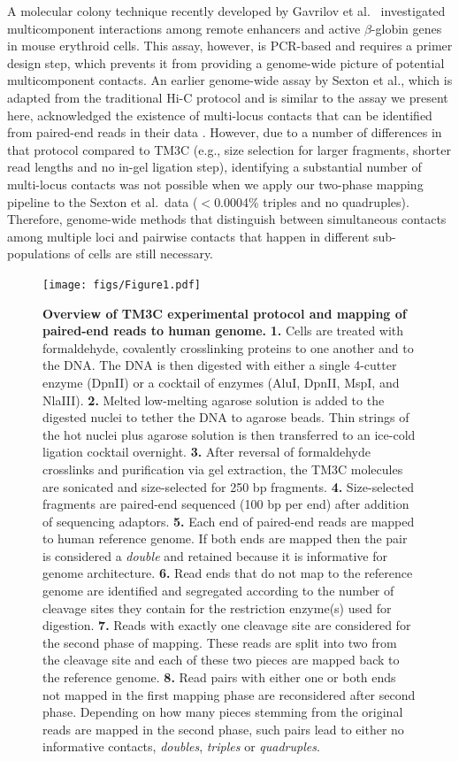 {
A molecular colony technique recently developed by Gavrilov et
al.\ \cite{gavrilov:quantitative} investigated multicomponent interactions
among remote enhancers and active $\beta$-globin genes in
mouse erythroid cells. This assay, however, is PCR-based and requires a
primer design step, which prevents it from providing a genome-wide
picture of potential multicomponent contacts. An earlier genome-wide
assay by Sexton et al., which is adapted from the traditional Hi-C protocol and
is similar to the assay we present here, acknowledged the existence
of multi-locus contacts that can be identified from paired-end reads
in their data \cite{sexton:three-dimensional}.
However, due to a number of differences in that
protocol compared to TM3C (e.g., size selection for larger fragments,
shorter read lengths and no in-gel ligation step), identifying a
substantial number of multi-locus contacts was not possible when we
apply our two-phase mapping pipeline to the Sexton et al.\ data
($<$0.0004\% triples and no quadruples). Therefore, genome-wide methods
that distinguish between simultaneous contacts among multiple loci and
pairwise contacts that happen in different sub-populations of cells
are still necessary.
}
\begin{figure}
\centering
\texttt{[image: figs/Figure1.pdf]}
\caption{
\textbf{Overview of TM3C experimental protocol and mapping of paired-end reads to human genome.}
  {\bf 1.} Cells are treated with
  formaldehyde, covalently crosslinking proteins to one another and to
  the DNA. The DNA is then digested with either a single 4-cutter
  enzyme (DpnII) or a cocktail of enzymes (AluI, DpnII, MspI, and
  NlaIII). {\bf 2.} Melted low-melting agarose solution is added to
  the digested nuclei to tether the DNA to agarose beads.  Thin
  strings of the hot nuclei plus agarose solution is then transferred to an
  ice-cold ligation cocktail overnight. {\bf 3.} After reversal of
  formaldehyde crosslinks and purification via gel extraction, the
  TM3C molecules are sonicated and size-selected for 250 bp fragments.
  {\bf 4.} Size-selected fragments are paired-end sequenced (100 bp per end)
  after addition of sequencing adaptors.
  {\bf 5.} Each end of paired-end reads are mapped to human reference genome.
  If both ends are mapped then the pair is considered a \emph{double} and retained
  because it is informative for genome architecture.
  {\bf 6.} Read ends that do not map to the reference genome are identified
  and segregated according to the number of cleavage sites they contain for
  the restriction enzyme(s) used for digestion.
  {\bf 7.} Reads with exactly one cleavage site are considered for the second
  phase of mapping. These reads are split into two from the cleavage site and
  each of these two pieces are mapped back to the reference genome.
  {\bf 8.} Read pairs with either one or both ends not mapped in the first
  mapping phase are reconsidered after second phase. Depending on how many
  pieces stemming from the original reads are mapped in the second phase,
  such pairs lead to either no informative contacts, \emph{doubles},
  \emph{triples} or \emph{quadruples}.
}
\label{fig:outline}
\end{figure}


